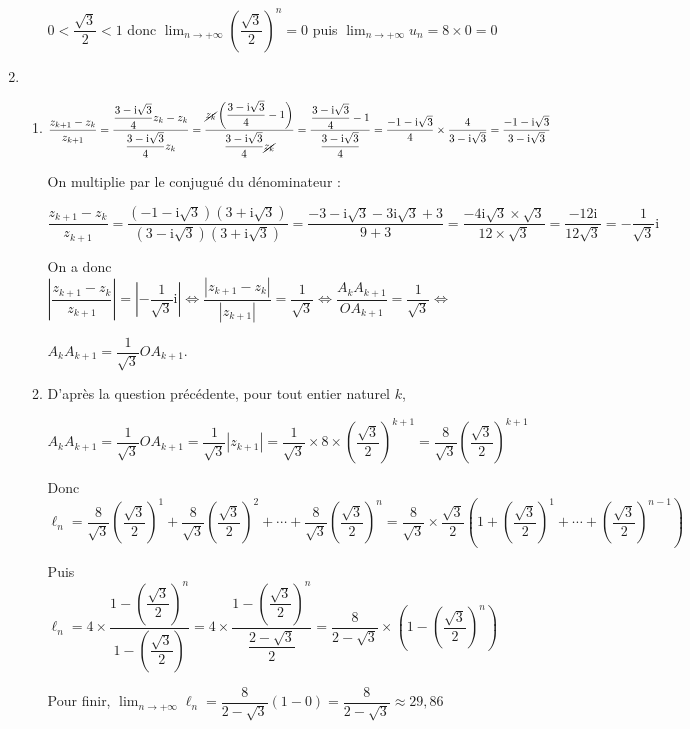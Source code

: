 \documentclass[10pt]{article}
\begin{document}
\begin{enumerate}
\begin{enumerate}
$0 < \dfrac{\sqrt{3}}{2} < 1$ donc $\displaystyle\lim_{n \to + \infty} \left( \dfrac{\sqrt{3}}{2} \right)^n = 0$ puis $\boxed{ \displaystyle\lim_{n \to + \infty} u_n = 8 \times 0 = 0 }$		
	\end{enumerate}
	\item 
	\begin{enumerate}
		\item $\dfrac{z_{k+1} - z_k}{z_{k+1} } = \dfrac{ \dfrac{3-\text{i}\sqrt{3}}{4}z_k - z_k}{ \dfrac{3-\text{i}\sqrt{3}}{4}z_k } = \dfrac{ \cancel{z_k} \left( \dfrac{3-\text{i}\sqrt{3}}{4} - 1 \right)}{ \dfrac{3-\text{i}\sqrt{3}}{4}\cancel{z_k} } 
		=\dfrac{ \dfrac{3-\text{i}\sqrt{3}}{4} - 1 }{\dfrac{3-\text{i}\sqrt{3}}{4}}
		= \dfrac{ -1-\text{i}\sqrt{3} }{4} \times \dfrac{4}{3-\text{i}\sqrt{3}} 
		= \dfrac{ -1-\text{i}\sqrt{3} }{3-\text{i}\sqrt{3}}$\medskip 
		
On multiplie par le conjugué du dénominateur :\smallskip 
		
$\dfrac{z_{k+1} - z_k}{z_{k+1}}
		=\dfrac{ (-1-\text{i}\sqrt{3})(3+\text{i}\sqrt{3}) }{ (3-\text{i}\sqrt{3})(3+\text{i}\sqrt{3})} 
		= \dfrac{-3-\text{i}\sqrt{3}-3\text{i}\sqrt{3}+3 }{9+3} = \dfrac{-4\text{i}\sqrt{3}\times \sqrt{3} }{12 \times \sqrt{3} } = \dfrac{-12\text{i}}{12\sqrt{3}} = - \dfrac{1}{\sqrt{3}} \text{i}$\medskip 
		
On a donc $\left|\dfrac{z_{k+1} - z_k}{z_{k+1} }\right| = \left|- \dfrac{1}{\sqrt{3}} \text{i}\right|
		\iff \dfrac{\left|z_{k+1} - z_k \right|}{\left|z_{k+1} \right|} = \dfrac{1}{\sqrt{3}} 
		\iff \dfrac{A_kA_{k+1}}{OA_{k+1}} = \dfrac{1}{\sqrt{3}}
		\iff $
		
$A_kA_{k+1} = \dfrac{1}{\sqrt{3}} OA_{k+1}$. \medskip 
		
		\item D'après la question précédente, pour tout entier naturel $k$,\smallskip 
		
$A_kA_{k+1} = \dfrac{1}{\sqrt{3}} OA_{k+1} = \dfrac{1}{\sqrt{3}} \left|z_{k+1} \right| = \dfrac{1}{\sqrt{3}} \times 8 \times \left( \dfrac{\sqrt{3}}{2} \right)^{k+1} = \dfrac{8}{\sqrt{3}} \left( \dfrac{\sqrt{3}}{2} \right)^{k+1}$ \medskip 
		
Donc $\ell_n=\dfrac{8}{\sqrt{3}} \left( \dfrac{\sqrt{3}}{2} \right)^1 + \dfrac{8}{\sqrt{3}} \left( \dfrac{\sqrt{3}}{2} \right)^2 + \cdots + \dfrac{8}{\sqrt{3}} \left( \dfrac{\sqrt{3}}{2} \right)^n
		= \dfrac{8}{\sqrt{3}} \times \dfrac{\sqrt{3}}{2} \left( 1 +  \left( \dfrac{\sqrt{3}}{2} \right)^1 + \cdots + \left( \dfrac{\sqrt{3}}{2} \right)^{n-1} \right)$\medskip 
		
Puis $\ell_n=4 \times \dfrac{1 - \left( \dfrac{\sqrt{3}}{2} \right)^{n} }{1-\left( \dfrac{\sqrt{3}}{2} \right)}
		=4 \times \dfrac{1 - \left( \dfrac{\sqrt{3}}{2} \right)^{n} }{\dfrac{2-\sqrt{3}}{2}}
		=\dfrac{8}{2-\sqrt{3}} \times \left( 1 - \left( \dfrac{\sqrt{3}}{2} \right)^{n} \right)$\medskip 
		
Pour finir, $\displaystyle\lim_{n \to + \infty} \ell_n=\dfrac{8}{2-\sqrt{3}}(1-0) =\dfrac{8}{2-\sqrt{3}} \approx 29,86$
	\end{enumerate}
\end{enumerate}
\end{document}
